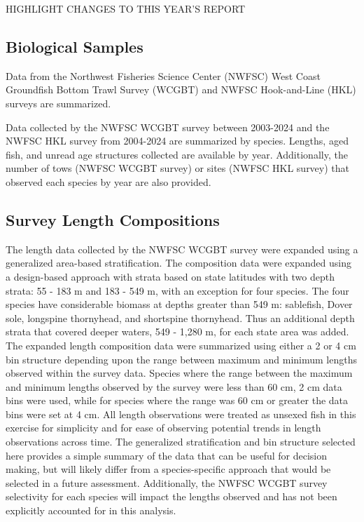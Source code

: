 \documentclass[
  english,
]{article}
\begin{document}
HIGHLIGHT CHANGES TO THIS YEAR'S REPORT

\subsection{Biological Samples}\label{biological-samples}

Data from the Northwest Fisheries Science Center (NWFSC) West Coast
Groundfish Bottom Trawl Survey (WCGBT) and NWFSC Hook-and-Line (HKL)
surveys are summarized.

Data collected by the NWFSC WCGBT survey between 2003-2024 and the NWFSC
HKL survey from 2004-2024 are summarized by species. Lengths, aged fish,
and unread age structures collected are available by year. Additionally,
the number of tows (NWFSC WCGBT survey) or sites (NWFSC HKL survey) that
observed each species by year are also provided.

\subsection{Survey Length
Compositions}\label{survey-length-compositions}

The length data collected by the NWFSC WCGBT survey were expanded using
a generalized area-based stratification. The composition data were
expanded using a design-based approach with strata based on state
latitudes with two depth strata: 55 - 183 m and 183 - 549 m, with an
exception for four species. The four species have considerable biomass
at depths greater than 549 m: sablefish, Dover sole, longspine
thornyhead, and shortspine thornyhead. Thus an additional depth strata
that covered deeper waters, 549 - 1,280 m, for each state area was
added. The expanded length composition data were summarized using either
a 2 or 4 cm bin structure depending upon the range between maximum and
minimum lengths observed within the survey data. Species where the range
between the maximum and minimum lengths observed by the survey were less
than 60 cm, 2 cm data bins were used, while for species where the range
was 60 cm or greater the data bins were set at 4 cm. All length
observations were treated as unsexed fish in this exercise for
simplicity and for ease of observing potential trends in length
observations across time. The generalized stratification and bin
structure selected here provides a simple summary of the data that can
be useful for decision making, but will likely differ from a
species-specific approach that would be selected in a future assessment.
Additionally, the NWFSC WCGBT survey selectivity for each species will
impact the lengths observed and has not been explicitly accounted for in
this analysis.
\end{document}
